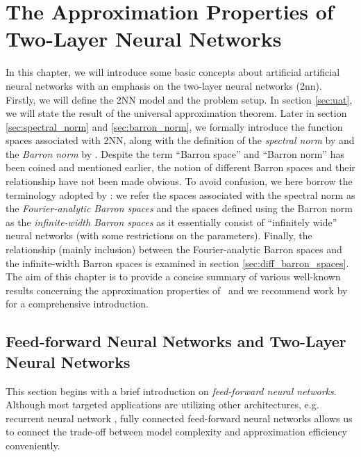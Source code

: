 \chapter{The Approximation Properties of Two-Layer Neural Networks}

In this chapter, we will introduce some basic concepts about artificial
artificial neural networks with an emphasis on the two-layer neural networks
(\gls{2nn}). Firstly, we will define the 2NN model and the problem setup. In
section \ref{sec:uat}, we will state the result of the universal approximation
theorem. Later in section \ref{sec:spectral_norm} and \ref{sec:barron_norm}, we
formally introduce the function spaces associated with 2NN, along with the
definition of the \textit{spectral norm} by
\cite{barronUniversalApproximationBounds1993} and the \textit{Barron norm} by
\cite{eBarronSpaceFlowinduced2021}. Despite the term ``Barron space'' and
``Barron norm'' has been coined and mentioned earlier, the notion of different
Barron spaces and their relationship have not been made obvious. To avoid
confusion, we here borrow the terminology adopted by
\cite{carageaNeuralNetworkApproximation2022}: we refer the spaces associated
with the spectral norm as the \textit{Fourier-analytic Barron spaces} and the
spaces defined using the Barron norm as the \textit{infinite-width Barron
spaces} as it essentially consist of ``infinitely wide'' neural networks (with
some restrictions on the parameters). Finally, the relationship (mainly
inclusion) between the Fourier-analytic Barron spaces and the infinite-width
Barron spaces is examined in section \ref{sec:diff_barron_spaces}. The aim of
this chapter is to provide a concise summary of various well-known results
concerning the approximation properties of \ and we recommend work by
\cite{eMathematicalUnderstandingNeural2020,bernerModernMathematicsDeep2021} for
a comprehensive introduction.





\section{Feed-forward Neural Networks and Two-Layer Neural Networks}

This section begins with a brief introduction on \textit{feed-forward neural
networks}. Although most targeted applications are utilizing other architectures,
e.g. recurrent neural network \TOCITE, fully connected feed-forward neural
networks allows us to connect the trade-off between model complexity and
approximation efficiency conveniently.

